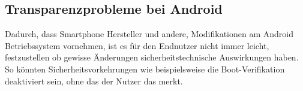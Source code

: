 \subsection{Transparenzprobleme bei Android}
Dadurch, dass Smartphone Hersteller und andere, Modifikationen am Android Betriebssystem vornehmen, ist es für den Endnutzer nicht immer leicht, festzustellen ob gewisse Änderungen sicherheitstechnische Auswirkungen haben. So könnten Sicherheitsvorkehrungen wie beispielsweise die Boot-Verifikation deaktiviert sein, ohne das der Nutzer das merkt.